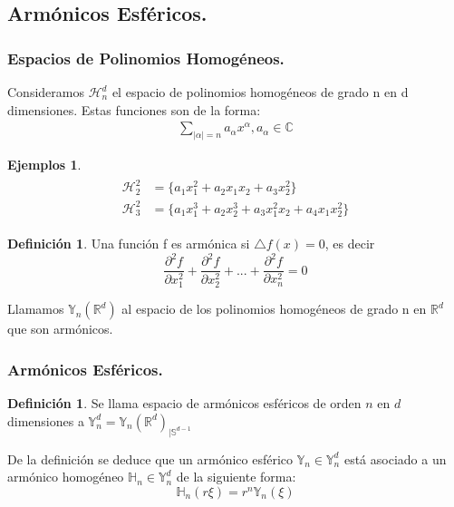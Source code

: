\documentclass{beamer}
\theoremstyle{plain}
\theoremstyle{definition}
\newtheorem{defn}[thm]{Definici\'{o}n}
\theoremstyle{plain}
\theoremstyle{definition}
\theoremstyle{remark}
\theoremstyle{definition}
\newtheorem{ejemplos}[thm]{Ejemplos}
\begin{document}
\subsection{Armónicos Esféricos.}
\begin{frame}
	\tableofcontents[currentsubsection]
\end{frame}
\begin{frame}
	\frametitle{Espacios de Polinomios Homogéneos.}
	Consideramos $\mathcal{H}^d_n$ el espacio de polinomios homogéneos de grado n en d dimensiones.
	Estas funciones son de la forma:
	\begin{gather*}
		\sum_{|\alpha|=n}a_\alpha x^\alpha, a_\alpha \in \mathds{C}
	\end{gather*}

	\begin{ejemplos}
		\begin{gather*}
		\begin{aligned}
		\mathcal{H}^2_2 &= \{ a_1x_1^2 + a_2x_1x_2 + a_3x_2^2\} \\
		\mathcal{H}^2_3 &= \{ a_1x_1^3 + a_2x_2^3 + a_3x_1^2x_2 + a_4x_1x_2^2 \}
		\end{aligned}
		\end{gather*}
	\end{ejemplos}
\end{frame}

\begin{frame}
	\begin{defn}
		Una función f es armónica si $\triangle f (x) = 0$, es decir $$\frac{\partial^2 f}{\partial x_1^2}+\frac{\partial^2 f}{\partial x_2^2}+...+\frac{\partial^2 f}{\partial x_n^2} = 0$$
	\end{defn}

	Llamamos $\mathds{Y}_n(\mathds{R}^d)$ al espacio de los polinomios homogéneos de grado n en $\mathds{R}^d$ que son armónicos.

\end{frame}
\begin{frame}
	\frametitle{Armónicos Esféricos.}
	\begin{defn}
		Se llama espacio de armónicos esféricos de orden $n$ en $d$ dimensiones a	$\mathds{Y}^d_n = \mathds{Y}_n(\mathds{R}^d)_{|\mathds{S}^{d-1}}$ 
	\end{defn}
	De la definición se deduce que un armónico esférico $\mathds{Y}_n \in \mathds{Y}^d_n$ está asociado a un armónico homogéneo $\mathds{H}_n \in \mathds{Y}^d_n$ de la siguiente forma:
	$$
	\mathds{H}_n(r\xi) = r^n\mathds{Y}_n(\xi)
	$$
\end{frame}
\end{document}
